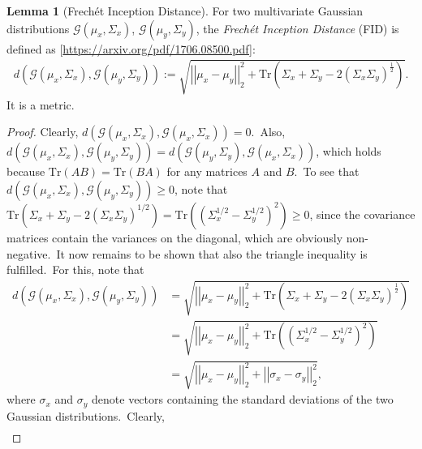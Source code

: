 \documentclass[12pt, a4paper]{article}
\numberwithin{equation}{section}
\theoremstyle{definition}
\theoremstyle{definition}
\newtheorem{lemma}[thm]{Lemma} %
\begin{document}
	\begin{lemma}[Frechét Inception Distance]
		For two multivariate Gaussian distributions $\mathcal G(\mu_{x}, \Sigma_{x})$, $\mathcal G(\mu_{y}, \Sigma_{y})$, the \textit{Frechét Inception Distance} (FID) is defined as [\url{https://arxiv.org/pdf/1706.08500.pdf}]: 
		\begin{align}
			d\left(\mathcal G(\mu_{x}, \Sigma_{x}), \mathcal G(\mu_{y}, \Sigma_{y})\right) := \sqrt{\left\vert\left\vert \mu_{x} - \mu_{y} \right\vert\right\vert_{2}^{2} + \text{Tr}\left(\Sigma_{x} + \Sigma_{y} - 2\left(\Sigma_{x}\Sigma_{y}\right)^{\frac{1}{2}}\right)}. 
		\end{align}
		It is a metric.\
	\end{lemma}
	\begin{proof}
		Clearly, $d\left(\mathcal G(\mu_{x}, \Sigma_{x}), \mathcal G(\mu_{x}, \Sigma_{x})\right) = 0$.\ Also, $d\left(\mathcal G(\mu_{x}, \Sigma_{x}), \mathcal G(\mu_{y}, \Sigma_{y})\right) = d\left(\mathcal G(\mu_{y}, \Sigma_{y}), \mathcal G(\mu_{x}, \Sigma_{x})\right)$, which holds because $\text{Tr}(AB) = \text{Tr}(BA)$ for any matrices $A$ and $B$.\ To see that $d\left(\mathcal G(\mu_{x}, \Sigma_{x}), \mathcal G(\mu_{y}, \Sigma_{y})\right) \geq 0$, note that $\text{Tr}(\Sigma_{x} + \Sigma_{y} - 2\left(\Sigma_{x}\Sigma_{y}\right)^{1/2}) = \text{Tr}\left(\left(\Sigma_{x}^{1/2} - \Sigma_{y}^{1/2}\right)^{2}\right) \geq 0$, since the covariance matrices contain the variances on the diagonal, which are obviously non-negative.\ It now remains to be shown that also the triangle inequality is fulfilled.\ For this, note that 
		\begin{align}
			d\left(\mathcal G(\mu_{x}, \Sigma_{x}), \mathcal G(\mu_{y}, \Sigma_{y})\right) &= \sqrt{\left\vert\left\vert \mu_{x} - \mu_{y} \right\vert\right\vert_{2}^{2} + \text{Tr}\left(\Sigma_{x} + \Sigma_{y} - 2\left(\Sigma_{x}\Sigma_{y}\right)^{\frac{1}{2}}\right)} 
			\\ &= \sqrt{\left\vert\left\vert \mu_{x} - \mu_{y} \right\vert\right\vert_{2}^{2} + \text{Tr}\left(\left(\Sigma_{x}^{1/2} - \Sigma_{y}^{1/2}\right)^{2}\right)}
			\\ &= \sqrt{\left\vert\left\vert \mu_{x} - \mu_{y} \right\vert\right\vert_{2}^{2} + \left\vert\left\vert \sigma_{x} - \sigma_{y}\right\vert\right\vert_{2}^{2}}, 
		\end{align}
		where $\sigma_{x}$ and $\sigma_{y}$ denote vectors containing the standard deviations of the two Gaussian distributions.\ Clearly, 
		\begin{align}

\end{align}
\end{proof}
\end{document}
